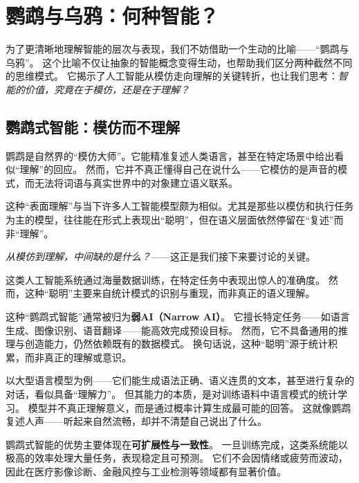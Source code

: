 
\section{鹦鹉与乌鸦：何种智能？}

为了更清晰地理解智能的层次与表现，我们不妨借助一个生动的比喻——“鹦鹉与乌鸦”。
这个比喻不仅让抽象的智能概念变得生动，也帮助我们区分两种截然不同的思维模式。  
它揭示了人工智能从模仿走向理解的关键转折，也让我们思考：\emph{智能的价值，究竟在于模仿，还是在于理解？}

\subsection{鹦鹉式智能：模仿而不理解}

鹦鹉是自然界的“模仿大师”。它能精准复述人类语言，甚至在特定场景中给出看似“理解”的回应。  
然而，它并不真正懂得自己在说什么——它模仿的是声音的模式，而无法将词语与真实世界中的对象建立语义联系。  
  
这种“表面理解”与当下许多人工智能模型颇为相似。尤其是那些以模仿和执行任务为主的模型，往往能在形式上表现出“聪明”，但在语义层面依然停留在“复述”而非“理解”。  

\emph{从模仿到理解，中间缺的是什么？}——这正是我们接下来要讨论的关键。

这类人工智能系统通过海量数据训练，在特定任务中表现出惊人的准确度。  
然而，这种“聪明”主要来自统计模式的识别与重现，而非真正的语义理解。  
  
这种“鹦鹉式智能”通常被归为\textbf{弱AI（Narrow AI）}。  
它擅长特定任务——如语言生成、图像识别、语音翻译——能高效完成预设目标。  
然而，它不具备通用的推理与创造能力，仍然依赖既有的数据模式。  
换句话说，这种“聪明”源于统计积累，而非真正的理解或意识。  

以大型语言模型为例——它们能生成语法正确、语义连贯的文本，甚至进行复杂的对话，看似具备“理解力”。  
但其能力的本质，是对训练语料中语言模式的统计学习。  
模型并不真正理解意义，而是通过概率计算生成最可能的回答。  
这就像鹦鹉复述人声——听起来自然流畅，却并不清楚自己说出了什么。  

鹦鹉式智能的优势主要体现在\textbf{可扩展性与一致性}。  
一旦训练完成，这类系统能以极高的效率处理大量任务，表现稳定且可预测。  
它们不会因情绪或疲劳而波动，因此在医疗影像诊断、金融风控与工业检测等领域都有显著价值。  

